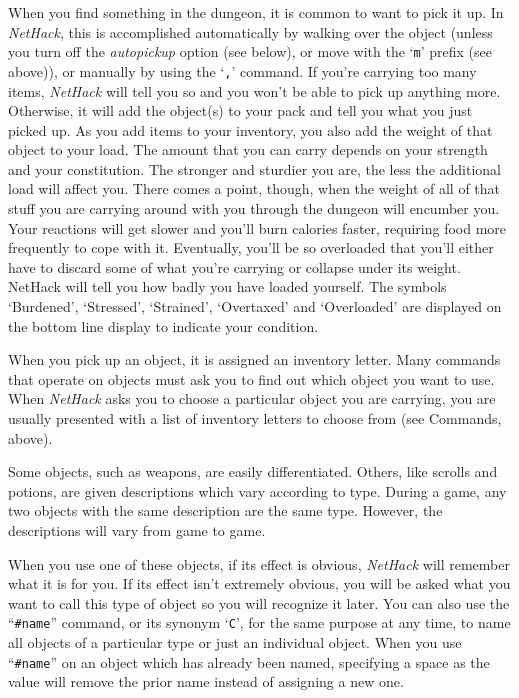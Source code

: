 When you find something in the dungeon, it is common to want to pick
it up.  In {\it NetHack}, this is accomplished automatically by walking over
the object (unless you turn off the {\it autopickup\/}
option (see below), or move with the `{\tt m}' prefix (see above)), or
manually by using the `{\tt ,}' command.
If you're carrying too many items, {\it NetHack\/} will tell you so and you
won't be able to pick up anything more.  Otherwise, it will add the object(s)
to your pack and tell you what you just picked up.
As you add items to your inventory, you also add the weight of that object
to your load.  The amount that you can carry depends on your strength and
your constitution.  The
stronger and sturdier
you are, the less the additional load will affect you.  There comes
a point, though, when the weight of all of that stuff you are carrying around
with you through the dungeon will encumber you.  Your reactions
will get slower and you'll burn calories faster, requiring food more frequently
to cope with it.  Eventually, you'll be so overloaded that you'll either have
to discard some of what you're carrying or collapse under its weight.
NetHack will tell you how badly you have loaded yourself.  The symbols
`Burdened', `Stressed', `Strained', `Overtaxed' and `Overloaded' are
displayed on the bottom line display to indicate your condition.

When you pick up an object, it is assigned an inventory letter.  Many
commands that operate on objects must ask you to find out which object
you want to use.  When {\it NetHack\/} asks you to choose a particular object
you are carrying, you are usually presented with a list of inventory
letters to choose from (see Commands, above).

Some objects, such as weapons, are easily differentiated.  Others, like
scrolls and potions, are given descriptions which vary according to
type.  During a game, any two objects with the same description are
the same type.  However, the descriptions will vary from game to game.

When you use one of these objects, if its effect is obvious, {\it NetHack\/}
will remember what it is for you.  If its effect isn't extremely
obvious, you will be asked what you want to call this type of object
so you will recognize it later.  You can also use the ``{\tt \#name}''
command, or its synonym `{\tt C}', for the same purpose at any time, to name
all objects of a particular type or just an individual object.
When you use ``{\tt \#name}'' on an object which has already been named,
specifying a space as the value will remove the prior name instead
of assigning a new one.


